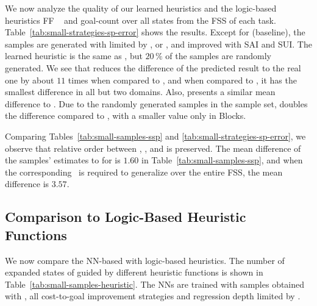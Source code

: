 We now analyze the quality of our learned heuristics and the logic-based heuristics FF \hff~\cite{Hoffmann.Nebel/2001} and goal-count \hgc over all states from the FSS of each task. Table~\ref{tab:small-strategies-sp-error} shows the results. Except for \hnnbase (baseline), the samples are generated with \bfsrw limited by , \facts or \meanfx, and improved with SAI and SUI. The learned heuristic \hnnrs is the same as \hnnbfsrwl{\meanfx}, but $20\,\%$ of the samples are randomly generated. We see that \hnnbfsrwl{\meanfx} reduces the difference of the predicted result to the real one by about $11$ times when compared to \hnnbase, and when compared to \hgc, it has the smallest difference in all but two domains. Also, \hnnbfsrwl{\meanfx} presents a similar mean difference to \hff. Due to the randomly generated samples in the sample set, \hnnrs doubles the difference compared to \hnnbfsrwl{\meanfx}, with a smaller value only in Blocks.



Comparing Tables~\ref{tab:small-samples-ssp} and \ref{tab:small-strategies-sp-error}, we observe that relative order between , \facts, and \meanfx is preserved. The mean difference of the samples' estimates to \hstar for \meanfx is $1.60$ in Table~\ref{tab:small-samples-ssp}, and when the corresponding~\hnnbfsrwl{\meanfx} is required to generalize over the entire FSS, the mean difference is $3.57$.

\subsection{Comparison to Logic-Based Heuristic Functions}

We now compare the NN-based \hnn with logic-based heuristics. The number of expanded states of \gbfs guided by different heuristic functions is shown in Table~\ref{tab:small-samples-heuristic}. The NNs are trained with samples obtained with \bfsrw, all cost-to-goal improvement strategies and regression depth limited by \meanfx.  





